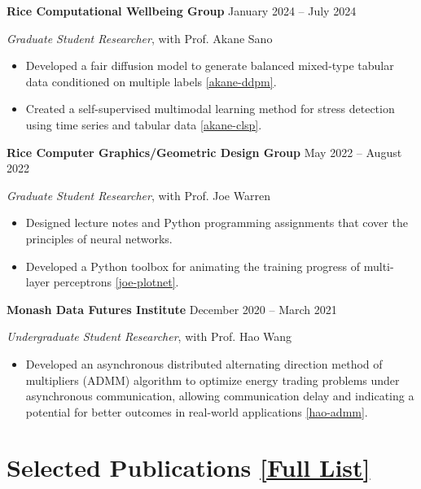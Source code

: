 \documentclass[11pt]{article}
\begin{document}
\vspace{\lineskip}

\textbf{Rice Computational Wellbeing Group} \hfill January 2024 -- July 2024

\textit{Graduate Student Researcher}, with Prof. Akane Sano

\begin{itemize}
    \item Developed a fair diffusion model to generate balanced mixed-type tabular data conditioned on multiple labels \ref{akane-ddpm}.
    \item Created a self-supervised multimodal learning method for stress detection using time series and tabular data \ref{akane-clsp}.
\end{itemize}

\vspace{\lineskip}

\textbf{Rice Computer Graphics/Geometric Design Group} \hfill May 2022 -- August 2022

\textit{Graduate Student Researcher}, with Prof. Joe Warren

\begin{itemize}
    \item Designed lecture notes and Python programming assignments that cover the principles of neural networks.
    \item Developed a Python toolbox for animating the training progress of multi-layer perceptrons \ref{joe-plotnet}.
\end{itemize}

\vspace{\lineskip}

\textbf{Monash Data Futures Institute} \hfill December 2020 -- March 2021

\textit{Undergraduate Student Researcher}, with Prof. Hao Wang

\begin{itemize}
    \item Developed an asynchronous distributed alternating direction method of multipliers (ADMM) algorithm to optimize energy trading problems under asynchronous communication, allowing communication delay and indicating a potential for better outcomes in real-world applications \ref{hao-admm}.
\end{itemize}

\section*{Selected Publications \hfill \href{https://scholar.google.com/citations?user=CaKsmnUAAAAJ&hl=en}{[Full List]}}
\end{document}
